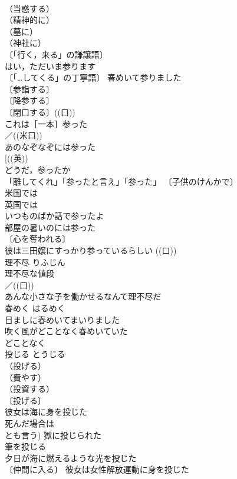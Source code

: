\documentclass[8pt]{extreport}
\begin{document}
\begin{CJK}{UTF8}{min}
\\	（当惑する）
\\	（精神的に）
\\	（墓に）
\\	（神社に）
\\	〔「行く，来る」の謙譲語〕
\\	はい，ただいま参ります 
\\	〔「…してくる」の丁寧語〕 春めいて参りました 
\\	〔参詣する〕
\\	〔降参する〕
\\	〔閉口する〕((口)) 
\\	これは［一本］参った 
\\	／((米口)) 
\\	あのなぞなぞには参った 
\\	[((英))
\\	どうだ，参ったか 
\\	「離してくれ」「参ったと言え」「参った」 〔子供のけんかで〕 
\\	米国では
\\	英国では
\\	いつものばか話で参ったよ 
\\	部屋の暑いのには参った 
\\	〔心を奪われる〕
\\	彼は三田嬢にすっかり参っているらしい ((口)) 
\\	理不尽	りふじん	
\\	理不尽な値段 
\\	／((口)) 
\\	あんな小さな子を働かせるなんて理不尽だ 
\\	春めく	はるめく	
\\	日ましに春めいてまいりました 
\\	吹く風がどことなく春めいていた 
\\	どことなく　
\\	投じる	とうじる	
\\	（投げる）
\\	（費やす）
\\	（投資する）
\\	〔投げる〕
\\	彼女は海に身を投じた 
\\	死んだ場合は
\\	とも言う) 獄に投じられた 
\\	筆を投じる 
\\	夕日が海に燃えるような光を投じた 
\\	〔仲間に入る〕 彼女は女性解放運動に身を投じた 

\end{CJK}
\end{document}

